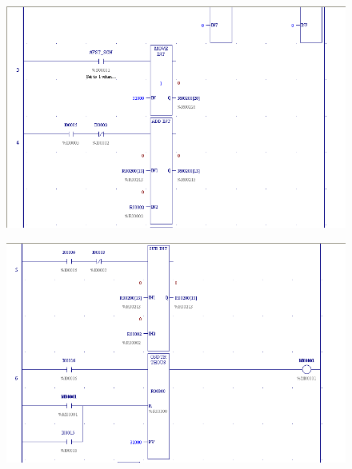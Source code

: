 \documentclass[12pt]{article}
\begin{document}
\begin{figure}[H]
    \centering
    \includegraphics[width = \textwidth]{./zdj/network3.png}
\end{figure}
\begin{figure}[H]
    \centering
    \includegraphics[width = \textwidth]{./zdj/network4.png}
\end{figure}

\end{document}
